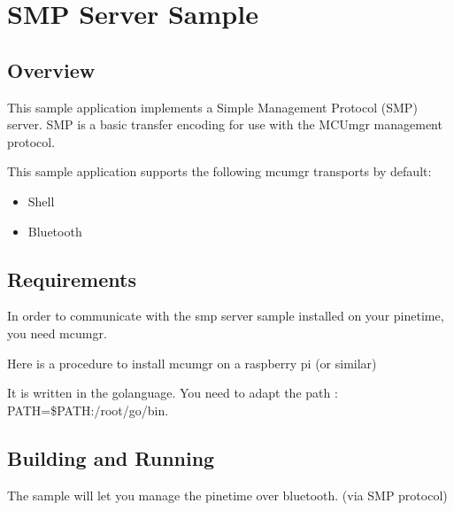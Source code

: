 \documentclass[letterpaper,10pt,english]{sphinxmanual}
\begin{document}
\begin{sphinxVerbatim}[commandchars=\\\{\}]
\end{sphinxVerbatim}


\section{SMP Server Sample}
\label{\detokenize{fota/smp_svr:smp-server-sample}}\label{\detokenize{fota/smp_svr:smp-svr-sample}}\label{\detokenize{fota/smp_svr::doc}}

\subsection{Overview}
\label{\detokenize{fota/smp_svr:overview}}
This sample application implements a Simple Management Protocol (SMP) server.
SMP is a basic transfer encoding for use with the MCUmgr management protocol.

This sample application supports the following mcumgr transports by default:
\begin{itemize}
\item {} 
Shell

\item {} 
Bluetooth

\end{itemize}


\subsection{Requirements}
\label{\detokenize{fota/smp_svr:requirements}}
In order to communicate with the smp server sample installed on your pinetime, you need mcumgr.

Here is a procedure to install mcumgr on a raspberry pi  (or similar)

It is written in the go\sphinxhyphen{}language. You need to adapt the path :   PATH=\$PATH:/root/go/bin.


\subsection{Building and Running}
\label{\detokenize{fota/smp_svr:building-and-running}}
The sample will let you manage the pinetime over bluetooth. (via SMP protocol)
\end{document}
